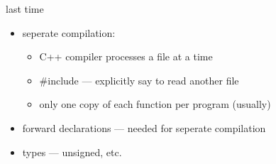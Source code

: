 \begin{frame}{last time}
    \begin{itemize}
    \item seperate compilation:
        \begin{itemize}
        \item C++ compiler processes a file at a time
        \item \#include --- explicitly say to read another file
        \item only one copy of each function per program (usually)
        \end{itemize}
    \item forward declarations --- needed for seperate compilation
    \item types --- unsigned, etc.
    \end{itemize}
\end{frame}

